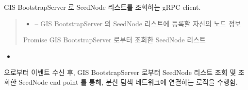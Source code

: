 \documentclass[a4paper,10pt,english]{sphinxmanual}
\begin{document}
\begin{fulllineitems}
\begin{fulllineitems}
\label{\detokenize{_DHSearch:DHSearch.getSeedNode}}
\pysigstartsignatures
{}
\pysigstopsignatures
\sphinxAtStartPar
GIS BootstrapServer 로 SeedNode 리스트를 조회하는 gRPC client.
\begin{quote}\begin{description}
\begin{itemize}
\item {} 
\sphinxAtStartPar
{} – GIS BootstrapServer 의 SeedNode 리스트에 등록할 자신의 노드 정보

\end{itemize}

\sphinxAtStartPar
Promise \sphinxhyphen{} GIS BootstrapServer 로부터 조회한 SeedNode 리스트

\end{description}\end{quote}


\nopagebreak

\begin{itemize}
\item {} 
\sphinxAtStartPar
{\hyperref[\detokenize{_DHSearch:DHSearch._bootstrapProcess}]{}}

\end{itemize}



\end{fulllineitems}


\begin{fulllineitems}
\label{\detokenize{_DHSearch:DHSearch.run}}
\pysigstartsignatures
{}
\pysigstopsignatures
\sphinxAtStartPar
{\hyperref[\detokenize{_DHDaemon:dhdaemon}]{}} 으로부터  이벤트 수신 후, GIS BootstrapServer 로부터 SeedNode 리스트 조회 및
조회한 SeedNode end point 를 통해, 분산 탐색 네트워크에 연결하는 로직을 수행함.



\end{fulllineitems}
\end{fulllineitems}
\end{document}

